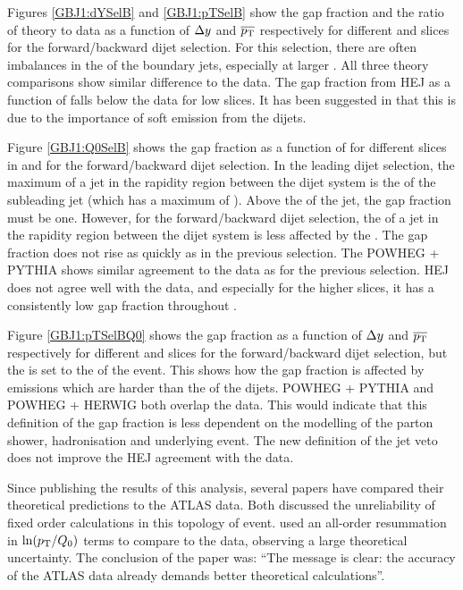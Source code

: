  
Figures \ref{GBJ1:dYSelB} and \ref{GBJ1:pTSelB} show the gap fraction and the ratio of theory to data as a function of $\mbox{$\Delta y$}{}$ and $\mbox{$\overline{p_{\rm T}}$}{}$ respectively for different \ptb{} and \dy{} slices for the forward/backward dijet selection.
For this selection, there are often imbalances in the \pt{} of the boundary jets, especially at larger \ptb{}.
All three theory comparisons show similar difference to the data. 
The gap fraction from HEJ as a function of \dy{} falls below the data for low \ptb{} slices. 
It has been suggested in \cite{ref:Anderson1} that this is due to the importance of soft emission from the dijets.

Figure \ref{GBJ1:Q0SelB} shows the gap fraction as a function of \qz{} for different slices in \dy{} and \ptb{} for the forward/backward dijet selection.
In the leading \pt{} dijet selection, the maximum \pt{} of a jet in the rapidity region between the dijet system is the \pt{} of the subleading jet (which has a maximum \pt{} of \ptb{}).
Above the \ptb{} of the jet, the gap fraction must be one.
However, for the forward/backward dijet selection, the \pt{} of a jet in the rapidity region between the dijet system is less affected by the \ptb{}.
The gap fraction does not rise as quickly as in the previous selection.
The POWHEG + PYTHIA  shows similar agreement to the data as for the previous selection.
HEJ does not agree well with the data, and especially for the higher \dy{} slices, it has a consistently low gap fraction throughout \qz{}. 

Figure \ref{GBJ1:pTSelBQ0} shows the gap fraction as a function of $\mbox{$\Delta y$}{}$ and $\mbox{$\overline{p_{\rm T}}$}{}$ respectively for different \ptb{} and \dy{} slices for the forward/backward dijet selection, but the \qz{} is set to the \ptb{} of the event. 
This shows how the gap fraction is affected by emissions which are harder than the \ptb{} of the  dijets. 
POWHEG + PYTHIA and POWHEG + HERWIG both overlap the data.
This would indicate that this definition of the gap fraction is less dependent on the modelling of the parton shower, hadronisation and underlying event.
The new definition of the jet veto does not improve the HEJ agreement with the data.


Since publishing the results of this analysis, several papers \cite{ref:Anderson1,ref:JeffNew} have compared  their theoretical predictions to the ATLAS data. 
Both discussed the unreliability of fixed order calculations in this topology of event.
\cite{ref:JeffNew} used an all-order resummation in $\ln(\mbox{$p_{\rm T}$}{}/\mbox{$Q_0$}{})$ terms to compare to the data, observing a large theoretical uncertainty. 
The conclusion of the paper was: ``The message is clear: the accuracy of the ATLAS data already demands better theoretical calculations''.


